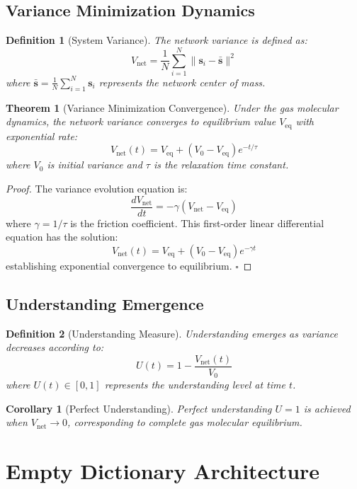 \documentclass[12pt,a4paper]{article}
\newtheorem{theorem}{Theorem}
\newtheorem{definition}{Definition}
\newtheorem{corollary}{Corollary}
\begin{document}
\subsection{Variance Minimization Dynamics}

\begin{definition}[System Variance]
The network variance is defined as:
$$V_{\text{net}} = \frac{1}{N} \sum_{i=1}^N \|\mathbf{s}_i - \bar{\mathbf{s}}\|^2$$
where $\bar{\mathbf{s}} = \frac{1}{N} \sum_{i=1}^N \mathbf{s}_i$ represents the network center of mass.
\end{definition}

\begin{theorem}[Variance Minimization Convergence]
Under the gas molecular dynamics, the network variance converges to equilibrium value $V_{\text{eq}}$ with exponential rate:
$$V_{\text{net}}(t) = V_{\text{eq}} + (V_0 - V_{\text{eq}}) e^{-t/\tau}$$
where $V_0$ is initial variance and $\tau$ is the relaxation time constant.
\end{theorem}

\begin{proof}
The variance evolution equation is:
$$\frac{dV_{\text{net}}}{dt} = -\gamma (V_{\text{net}} - V_{\text{eq}})$$
where $\gamma = 1/\tau$ is the friction coefficient. This first-order linear differential equation has the solution:
$$V_{\text{net}}(t) = V_{\text{eq}} + (V_0 - V_{\text{eq}}) e^{-\gamma t}$$
establishing exponential convergence to equilibrium. $\square$
\end{proof}

\subsection{Understanding Emergence}

\begin{definition}[Understanding Measure]
Understanding emerges as variance decreases according to:
$$U(t) = 1 - \frac{V_{\text{net}}(t)}{V_0}$$
where $U(t) \in [0,1]$ represents the understanding level at time $t$.
\end{definition}

\begin{corollary}[Perfect Understanding]
Perfect understanding $U = 1$ is achieved when $V_{\text{net}} \to 0$, corresponding to complete gas molecular equilibrium.
\end{corollary}

\section{Empty Dictionary Architecture}
\end{document}
